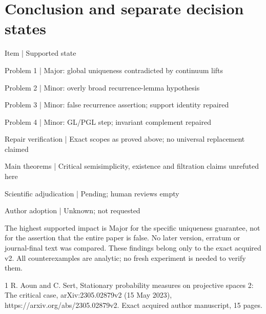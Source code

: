 \documentclass[10pt]{article}
\begin{document}
\section*{Conclusion and separate decision states}
Item | Supported state\par
Problem 1 | Major: global uniqueness contradicted by continuum lifts\par
Problem 2 | Minor: overly broad recurrence-lemma hypothesis\par
Problem 3 | Minor: false recurrence assertion; support identity repaired\par
Problem 4 | Minor: GL/PGL step; invariant complement repaired\par
Repair verification | Exact scopes as proved above; no universal replacement claimed\par
Main theorems | Critical semisimplicity, existence and filtration claims unrefuted here\par
Scientific adjudication | Pending; human reviews empty\par
Author adoption | Unknown; not requested\par
The highest supported impact is Major for the specific uniqueness guarantee, not for the assertion that the entire paper is false. No later version, erratum or journal-final text was compared. These findings belong only to the exact acquired v2. All counterexamples are analytic; no fresh experiment is needed to verify them.\par
1 R. Aoun and C. Sert, Stationary probability measures on projective spaces 2: The critical case, arXiv:2305.02879v2 (15 May 2023), https://arxiv.org/abs/2305.02879v2. Exact acquired author manuscript, 15 pages.\par
\end{document}
